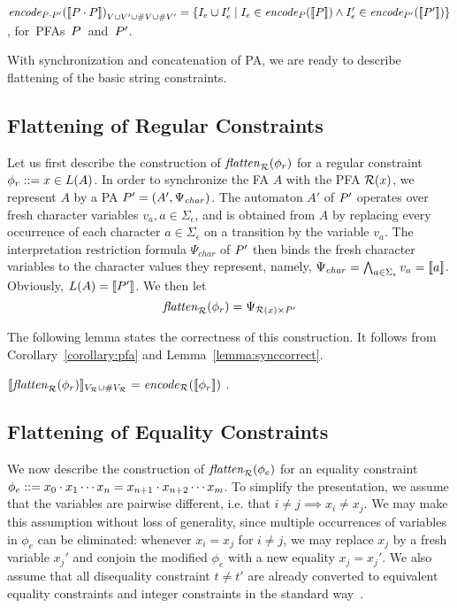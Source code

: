 \documentclass[sigplan,screen]{acmart}
\begin{document}
\begin{lemma}
$\mathit{encode}_{P \cdot P'}{([\![P \cdot P]\!])}_{V\cup V' \cup \#{V}\cup\#{V'}} =
\{I_e \cup I_e'\mid I_e \in \mathit{encode}_{P} ([\![P]\!]) \wedge I_e' \in\mathit{encode}_{P'} ([\![P']\!])\}$, \mbox{for PFAs $P$ and $P'$.}
\end{lemma}

With synchronization and concatenation of PA, we are ready to describe flattening of the basic string constraints.

\subsection{Flattening of Regular Constraints} \label{section:mem}

Let us first describe the construction of $\mathit{flatten}_{\mathcal{R}}(\phi_r)$ for a regular constraint $\phi_r ::= x \in L(A)$. 
In order to synchronize the FA $A$ with the PFA $\mathcal{R}(x)$, 
we represent $A$ by a PA $P' = (A',\Psi_{\mathit{char}})$.
The automaton $A'$ of $P'$ operates over fresh character variables $v_a, a\in\Sigma_\epsilon$, 
and is obtained from $A$ by replacing every occurrence of each character $a\in\Sigma_{\epsilon}$ on a transition by the variable $v_a$. 
The interpretation restriction formula $\Psi_{\mathit{char}}$ of $P'$ then binds the fresh character variables to the character values they represent, 
namely, $\Psi_{\mathit{char}} = \bigwedge_{a\in\Sigma_\epsilon} v_a = [\![a]\!]$. Obviously, $L(A) = [\![P']\!]$. 
We then let 
$$\mathit{flatten}_{\mathcal{R}}(\phi_r) = \Psi_{\mathcal{R}(x) \times P'}$$ 

The following lemma states the correctness of this construction. 
It follows from Corollary~\ref{corollary:pfa} and Lemma~\ref{lemma:synccorrect}. 
\begin{lemma}\label{lemma:memcorrect}  $[\![\mathit{flatten}_{\mathcal{R}}(\phi_r)]\!]_{V_{\mathcal{R}} \cup \#V_{\mathcal{R}}} = \mathit{encode}_{\mathcal{R}} ([\![\phi_r]\!])$ . 
\end{lemma}

\subsection{Flattening of Equality Constraints} \label{section:eq}

We now describe the construction of $\mathit{flatten}_{\mathcal{R}}(\phi_e)$ for an equality constraint $\phi_e::= x_0\cdot x_1 \cdots x_n = x_{n+1}\cdot x_{n+2} \cdots x_m$. 
%
To simplify the presentation, we assume that the variables are pairwise different, i.e. that $i\neq j \implies x_i \neq x_j$. We may make this assumption without loss of generality, since multiple occurrences of variables in $\phi_e$ can be eliminated: whenever $x_i = x_j$ for $i \neq j$, we may replace $x_j$ by a fresh variable $x_j'$ and conjoin the modified $\phi_e$ with a new equality $x_j = x_j'$. 
%
We also assume that all disequality constraint $t \neq t'$ are already converted to equivalent equality constraints and integer constraints in the standard way~\cite{abdulla2015norn}.
\end{document}
